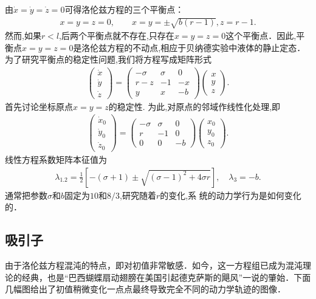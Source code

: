 由$\dot{x}=\dot{y}=\dot{z}=0$可得洛伦兹方程的三个平衡点：
\begin{align}
x=y=z=0,\qquad x=y=\pm\sqrt{b(r-1)}, z=r-1.
\end{align}
然而,如果$r<l$,后两个平衡点就不存在,只存在$x=y=z=0$这个平衡点．因此,平衡点$x=y=z=0$是洛伦兹方程的不动点,相应于贝纳德实验中液体的静止定态．为了研究平衡点的稳定性问题,我们将方程写成矩阵形式
\begin{align}
\left(\begin{array}{l}
\dot{x} \\
\dot{y} \\
\dot{z}
\end{array}\right)=\left(\begin{array}{ccc}
-\sigma & \sigma & 0 \\
r-z & -1 & -x \\
y & x & -b
\end{array}\right)\left(\begin{array}{l}
x \\
y \\
z
\end{array}\right) .
\end{align}
首先讨论坐标原点$x=y=z$的稳定性. 为此,对原点的邻域作线性化处理,即
\begin{align}
\left(\begin{array}{l}
\dot{x}_{0} \\
\dot{y}_{0} \\
\dot{z}_{0}
\end{array}\right)=\left(\begin{array}{ccc}
-\sigma & \sigma & 0 \\
r & -1 & 0 \\
0 & 0 & -b
\end{array}\right)\left(\begin{array}{l}
x_{0} \\
y_{0} \\
z_{0}
\end{array}\right).
\end{align}
线性方程系数矩阵本征值为
\begin{align}
\lambda_{1.2}=\frac{1}{2}\left[-(\sigma+1) \pm \sqrt{(\sigma-1)^{2}+4 \sigma r}\right], \quad \lambda_{3}=-b.
\end{align}
通常把参数$\sigma$和$b$固定为$10$和$8/3$,研究随着$r$的变化,系
统的动力学行为是如何变化的．

\subsection{吸引子}
由于洛伦兹方程混沌的特点，即对初值非常敏感．如今，这一方程组已成为混沌理论的经典，也是“巴西蝴蝶扇动翅膀在美国引起德克萨斯的飓风”一说的肇始．下面几幅图给出了初值稍微变化一点点最终导致完全不同的动力学轨迹的图像．


